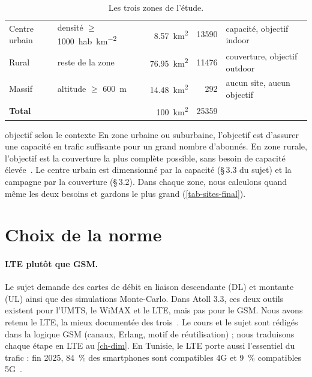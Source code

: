 \begin{table}[H]
\centering
\caption{Les trois zones de l'étude.}
\label{tab-zones}
\begin{tabularx}{\textwidth}{@{}lLrrL@{}}
\toprule
{} &  &  &  &  \\
\midrule
Centre urbain & densité $\geq$ \SI{1000}{hab\per\kilo\metre\squared} & \SI{8,57}{\kilo\metre\squared} & \num{13590} & capacité, objectif indoor \\
Rural & reste de la zone & \SI{76,95}{\kilo\metre\squared} & \num{11476} & couverture, objectif outdoor \\
Massif & altitude $\geq$ \SI{600}{\metre} & \SI{14,48}{\kilo\metre\squared} & \num{292} & aucun site, aucun objectif \\
\midrule
\textbf{Total} & & \SI{100}{\kilo\metre\squared} & \num{25359} & \\
\bottomrule
\end{tabularx}
\end{table}

\begin{cours}{objectif selon le contexte}
En zone urbaine ou suburbaine, l'objectif est d'assurer une capacité en trafic suffisante pour un grand nombre d'abonnés. En zone rurale, l'objectif est la couverture la plus complète possible, sans besoin de capacité élevée~\cite{afif2026cours}.
\application Le centre urbain est dimensionné par la capacité (§\,3.3 du sujet) et la campagne par la couverture (§\,3.2). Dans chaque zone, nous calculons quand même les deux besoins et gardons le plus grand (\cref{tab-sites-final}).
\end{cours}

\section{Choix de la norme}

\paragraph{LTE plutôt que GSM.} Le sujet demande des cartes de débit en liaison descendante (DL) et montante (UL) ainsi que des simulations Monte-Carlo. Dans Atoll 3.3, ces deux outils existent pour l'UMTS, le WiMAX et le LTE, mais pas pour le GSM. Nous avons retenu le LTE, la mieux documentée des trois~\cite{holma2011,sesia2011}. Le cours et le sujet sont rédigés dans la logique GSM (canaux, Erlang, motif de réutilisation) ; nous traduisons chaque étape en LTE au \cref{ch-dim}. En Tunisie, le LTE porte aussi l'essentiel du trafic : fin 2025, \SI{84}{\percent} des smartphones sont compatibles 4G et \SI{9}{\percent} compatibles 5G~\cite{intt2025tr4}.

